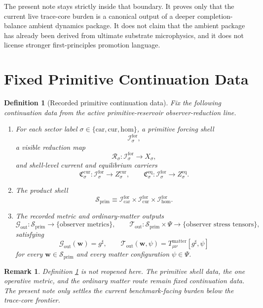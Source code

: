 \documentclass[11pt]{article}
\newcommand{\CompletedMetric}{g^{\sharp}}
\newcommand{\Car}{\mathrm{car}}
\newcommand{\Cur}{\mathrm{cur}}
\newcommand{\Hom}{\mathrm{hom}}
\newcommand{\ForSpace}[1]{\mathcal I_{#1}^{\mathrm{for}}}
\newcommand{\PrimShell}{\mathcal S_{\mathrm{prim}}}
\newcommand{\Reduction}[1]{\mathcal R_{#1}}
\newcommand{\CurrentCarrier}[1]{\mathfrak C_{#1}^{\mathrm{cur}}}
\newcommand{\EqCarrier}[1]{\mathfrak C_{#1}^{\mathrm{eq}}}
\newcommand{\MetricOut}{\mathscr G_{\mathrm{out}}}
\newcommand{\MatterOut}{\mathscr T_{\mathrm{out}}}
\newtheorem{definition}{Definition}
\newtheorem{remark}{Remark}
\begin{document}
The present note stays strictly inside that boundary. It proves only that the current live trace-core burden is a canonical output of a deeper completion-balance ambient dynamics package. It does not claim that the ambient package has already been derived from ultimate substrate microphysics, and it does not license stronger first-principles promotion language.

\section{Fixed Primitive Continuation Data}

\begin{definition}[Recorded primitive continuation data]
\label{def:fixed}
Fix the following continuation data from the active primitive-reservoir observer-reduction line.
\begin{enumerate}
    \item For each sector label \(\sigma\in\{\Car,\Cur,\Hom\}\), a primitive forcing shell
    \[
    \ForSpace{\sigma},
    \]
    a visible reduction map
    \[
    \Reduction{\sigma}:\ForSpace{\sigma}\to X_{\sigma},
    \]
    and shell-level current and equilibrium carriers
    \[
    \CurrentCarrier{\sigma}:\ForSpace{\sigma}\to Z_{\sigma}^{\mathrm{cur}},
    \qquad
    \EqCarrier{\sigma}:\ForSpace{\sigma}\to Z_{\sigma}^{\mathrm{eq}}.
    \]
    \item The product shell
    \[
    \PrimShell
    \equiv
    \ForSpace{\Car}\times \ForSpace{\Cur}\times \ForSpace{\Hom}.
    \]
    \item The recorded metric and ordinary-matter outputs
    \[
    \MetricOut:\PrimShell\to\{\text{observer metrics}\},
    \qquad
    \MatterOut:\PrimShell\times\Psi\to\{\text{observer stress tensors}\},
    \]
    satisfying
    \begin{equation}
    \MetricOut(\mathbf w)=\CompletedMetric,
    \qquad
    \MatterOut(\mathbf w,\psi)
    =
    T_{\mu\nu}^{\mathrm{matter}}[\CompletedMetric,\psi]
    \label{eq:fixedoutputs}
    \end{equation}
    for every \(\mathbf w\in\PrimShell\) and every matter configuration \(\psi\in\Psi\).
\end{enumerate}
\end{definition}

\begin{remark}
Definition \ref{def:fixed} is not reopened here. The primitive shell data, the one operative metric, and the ordinary matter route remain fixed continuation data. The present note only settles the current benchmark-facing burden below the trace-core frontier.
\end{remark}
\end{document}
